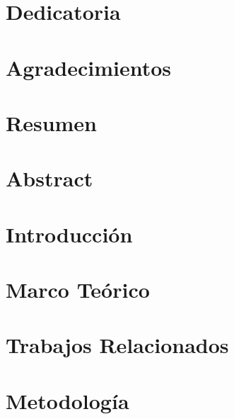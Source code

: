 \documentclass[12pt, twoside,openany]{book}
\begin{document}
\chapter{\centering Dedicatoria}
\label{chap:dedication}


\chapter{\centering Agradecimientos}
\label{chap:acknowledgments}


\chapter{\centering Resumen}
\label{chap:resumen}


\chapter{\centering Abstract}
\label{chap:abstract}


\tableofcontents 
\printglossaries
\listoftables
\listoffigures




\mainmatter

\newpage

\chapter{Introducción}
\label{chap:intro}


\chapter{Marco Teórico}
\label{chap:theory}


\chapter{Trabajos Relacionados}
\label{chap:state_of_art}


%

\chapter{Metodología}
\label{chap:methods}

\end{document}
